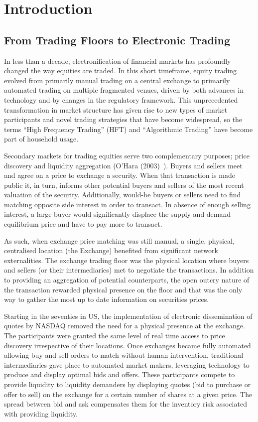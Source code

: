 
\chapter{Introduction}
\section{From Trading Floors to Electronic Trading}

In less than a decade, electronification of financial markets has profoundly changed the way equities are traded. In this short timeframe, equity trading evolved from primarily manual trading on a central exchange to primarily automated trading on multiple fragmented venues, driven by both advances in technology and by changes in the regulatory framework. This unprecedented transformation in market structure has given rise to new types of market participants and novel trading strategies that have become widespread, so the terms ``High Frequency Trading'' (HFT) and ``Algorithmic Trading'' have become part of household usage.


Secondary markets for trading equities serve two complementary purposes; price discovery and liquidity aggregation (O'Hara (2003)~\cite{ohara}). Buyers and sellers meet and agree on a price to exchange a security. When that transaction is made public it, in turn, informs other potential buyers and sellers of the most recent valuation of the security.  Additionally, would-be buyers or sellers need to find matching opposite side interest in order to transact. In absence of enough selling interest, a large buyer would significantly displace the supply and demand equilibrium price and have to pay more to transact.


As such, when exchange price matching was still manual, a single, physical, centralised location (the Exchange) benefited from significant network externalities. The exchange trading floor was the physical location where buyers and sellers (or their intermediaries) met to negotiate the transactions. In addition to providing an aggregation of potential counterparts, the open outcry nature of the transaction rewarded physical presence on the floor and that was the only way to gather the most up to date information on securities prices.


Starting in the seventies in US, the implementation of electronic dissemination of quotes by NASDAQ removed the need for a physical presence at the exchange. The participants were granted the same level of real time access to price discovery irrespective of their locations. Once exchanges became fully automated allowing buy and sell orders to match without human intervention, traditional intermediaries gave place to automated market makers, leveraging technology to produce and display optimal bids and offers. These participants compete to provide liquidity to liquidity demanders by displaying quotes (bid to purchase or offer to sell) on the exchange for a certain number of shares at a given price. The spread between bid and ask compensates them for the inventory risk associated with providing liquidity. 


